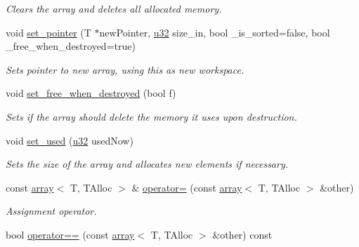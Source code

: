 \begin{DoxyCompactItemize}
\begin{DoxyCompactList}\small\item\em Clears the array and deletes all allocated memory. \end{DoxyCompactList}\item 
void \hyperlink{classirr_1_1core_1_1array_a1974e8df2e0edf983ee78534fc38de5c}{set\+\_\+pointer} (T $\ast$new\+Pointer, \hyperlink{namespaceirr_a0416a53257075833e7002efd0a18e804}{u32} size\+\_\+in, bool \+\_\+is\+\_\+sorted=false, bool \+\_\+free\+\_\+when\+\_\+destroyed=true)
\begin{DoxyCompactList}\small\item\em Sets pointer to new array, using this as new workspace. \end{DoxyCompactList}\item 
void \hyperlink{classirr_1_1core_1_1array_afddd43e25d3ad6b1a3d75ceab13e6c56}{set\+\_\+free\+\_\+when\+\_\+destroyed} (bool f)
\begin{DoxyCompactList}\small\item\em Sets if the array should delete the memory it uses upon destruction. \end{DoxyCompactList}\item 
void \hyperlink{classirr_1_1core_1_1array_a64d70ab89f03e2ec4deae3b6c0161305}{set\+\_\+used} (\hyperlink{namespaceirr_a0416a53257075833e7002efd0a18e804}{u32} used\+Now)
\begin{DoxyCompactList}\small\item\em Sets the size of the array and allocates new elements if necessary. \end{DoxyCompactList}\item 
const \hyperlink{classirr_1_1core_1_1array}{array}$<$ T, T\+Alloc $>$ \& \hyperlink{classirr_1_1core_1_1array_a51c964d180507ebdef872d93886c23b2}{operator=} (const \hyperlink{classirr_1_1core_1_1array}{array}$<$ T, T\+Alloc $>$ \&other)\hypertarget{classirr_1_1core_1_1array_a51c964d180507ebdef872d93886c23b2}{}\label{classirr_1_1core_1_1array_a51c964d180507ebdef872d93886c23b2}

\begin{DoxyCompactList}\small\item\em Assignment operator. \end{DoxyCompactList}\item 
bool \hyperlink{classirr_1_1core_1_1array_a718e705f3e3561c49ceee75afe0c3251}{operator==} (const \hyperlink{classirr_1_1core_1_1array}{array}$<$ T, T\+Alloc $>$ \&other) const \hypertarget{classirr_1_1core_1_1array_a718e705f3e3561c49ceee75afe0c3251}{}\label{classirr_1_1core_1_1array_a718e705f3e3561c49ceee75afe0c3251}


\end{DoxyCompactItemize}
